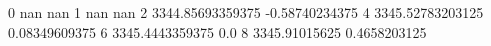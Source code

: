 0 nan nan
1 nan nan
2 3344.85693359375 -0.58740234375
4 3345.52783203125 0.08349609375
6 3345.4443359375 0.0
8 3345.91015625 0.4658203125
